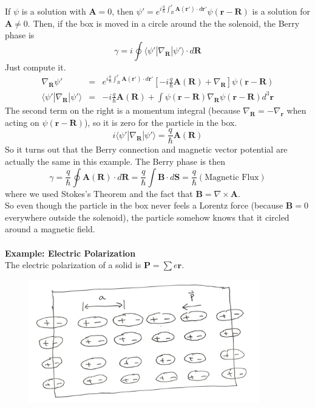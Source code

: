 \documentclass[a4paper,12pt]{article}
\renewcommand{\vec}[1]{\boldsymbol{\mathbf{#1}}}
\begin{document}
If $\psi$ is a solution with $\vec{A} = 0$, then $\psi'=e^{i\frac{q}{\hbar} \int_R^r \vec{A}(\vec{r'}) \cdot d\vec{r'}}\psi(\vec{r}-\vec{R})$ is a solution for $\vec{A} \ne 0$.  Then, if the box is moved in a circle around the the solenoid, the Berry phase is
\begin{equation}
\gamma = i \oint \langle \psi' | \nabla_{\vec{R}} | \psi' \rangle \cdot d\vec{R}
\end{equation}
Just compute it.
\begin{eqnarray}
\nabla_{\vec{R}} \psi' &=& e^{i\frac{q}{\hbar} \int_R^r \vec{A}(\vec{r'}) \cdot d\vec{r'}} \left[ -i \frac{q}{\hbar} \vec{A}(\vec{R}) + \nabla_{\vec{R}} \right] \psi(\vec{r}-\vec{R}) \\
\langle \psi' | \nabla_{\vec{R}} | \psi' \rangle &=& -i \frac{q}{\hbar} \vec{A}(\vec{R}) + \int \psi(\vec{r}-\vec{R}) \nabla_{\vec{R}} \psi(\vec{r}-\vec{R}) d^3\vec{r}
\end{eqnarray}
The second term on the right is a momentum integral (because $\nabla_{\vec{R}} = -\nabla_{\vec{r}}$ when acting on $\psi(\vec{r}-\vec{R})$), so it is zero for the particle in the box.
\begin{equation}
i \langle \psi' | \nabla_{\vec{R}} | \psi' \rangle = \frac{q}{\hbar} \vec{A}(\vec{R})
\end{equation}
So it turns out that the Berry connection and magnetic vector potential are actually the same in this example.  The Berry phase is then
\begin{equation}
\gamma = \frac{q}{\hbar} \oint \vec{A}(\vec{R}) \cdot d\vec{R} = \frac{q}{\hbar} \int \vec{B} \cdot d\vec{S} = \frac{q}{\hbar} \left( \text{Magnetic Flux} \right)
\end{equation}
where we used Stokes's Theorem and the fact that $\vec{B} = \nabla \times \vec{A}$. \\
So even though the particle in the box never feels a Lorentz force (because $\vec{B} = 0$ everywhere outside the solenoid), the particle somehow knows that it circled around a magnetic field.
\\ \\
\textbf{Example: Electric Polarization} \\
The electric polarization of a solid is $\vec{P} = \sum e \vec{r}$.

\begin{figure}[h!]
\centering
\includegraphics[width=100mm,keepaspectratio=true]{polarization.jpg}
\end{figure}
\end{document}
